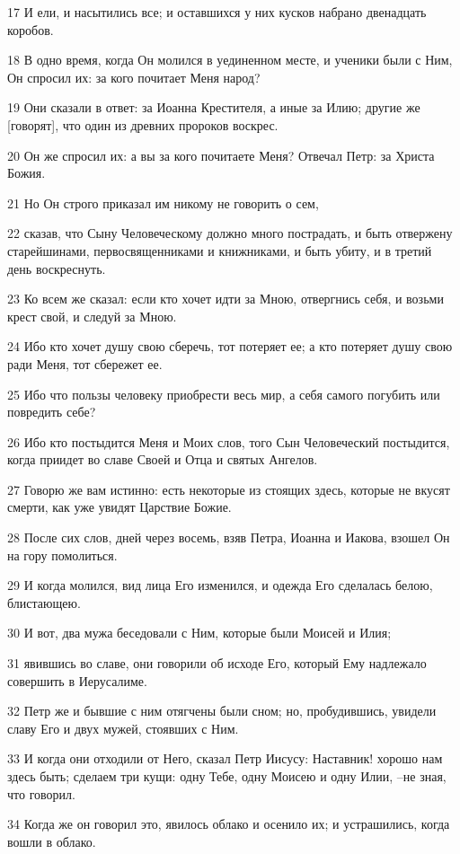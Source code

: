 \par 17 И ели, и насытились все; и оставшихся у них кусков набрано двенадцать коробов.
\par 18 В одно время, когда Он молился в уединенном месте, и ученики были с Ним, Он спросил их: за кого почитает Меня народ?
\par 19 Они сказали в ответ: за Иоанна Крестителя, а иные за Илию; другие же [говорят], что один из древних пророков воскрес.
\par 20 Он же спросил их: а вы за кого почитаете Меня? Отвечал Петр: за Христа Божия.
\par 21 Но Он строго приказал им никому не говорить о сем,
\par 22 сказав, что Сыну Человеческому должно много пострадать, и быть отвержену старейшинами, первосвященниками и книжниками, и быть убиту, и в третий день воскреснуть.
\par 23 Ко всем же сказал: если кто хочет идти за Мною, отвергнись себя, и возьми крест свой, и следуй за Мною.
\par 24 Ибо кто хочет душу свою сберечь, тот потеряет ее; а кто потеряет душу свою ради Меня, тот сбережет ее.
\par 25 Ибо что пользы человеку приобрести весь мир, а себя самого погубить или повредить себе?
\par 26 Ибо кто постыдится Меня и Моих слов, того Сын Человеческий постыдится, когда приидет во славе Своей и Отца и святых Ангелов.
\par 27 Говорю же вам истинно: есть некоторые из стоящих здесь, которые не вкусят смерти, как уже увидят Царствие Божие.
\par 28 После сих слов, дней через восемь, взяв Петра, Иоанна и Иакова, взошел Он на гору помолиться.
\par 29 И когда молился, вид лица Его изменился, и одежда Его сделалась белою, блистающею.
\par 30 И вот, два мужа беседовали с Ним, которые были Моисей и Илия;
\par 31 явившись во славе, они говорили об исходе Его, который Ему надлежало совершить в Иерусалиме.
\par 32 Петр же и бывшие с ним отягчены были сном; но, пробудившись, увидели славу Его и двух мужей, стоявших с Ним.
\par 33 И когда они отходили от Него, сказал Петр Иисусу: Наставник! хорошо нам здесь быть; сделаем три кущи: одну Тебе, одну Моисею и одну Илии, --не зная, что говорил.
\par 34 Когда же он говорил это, явилось облако и осенило их; и устрашились, когда вошли в облако.

